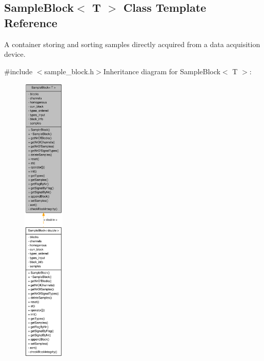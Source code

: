 \hypertarget{class_sample_block}{
\subsection{SampleBlock$<$ T $>$ Class Template Reference}
\label{class_sample_block}
}


A container storing and sorting samples directly acquired from a data acquisition device.  


{\ttfamily \#include $<$sample\_\-block.h$>$}Inheritance diagram for SampleBlock$<$ T $>$:\nopagebreak
\begin{figure}[H]
\begin{center}
\leavevmode
\includegraphics[height=400pt]{class_sample_block__inherit__graph}
\end{center}
\end{figure}
